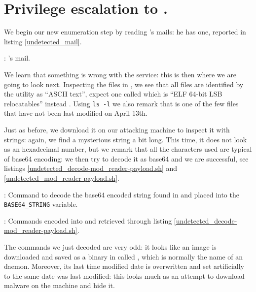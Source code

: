 \section{Privilege escalation to .}
\par We begin our new enumeration step by reading 's mails: he has one, reported in listing \ref{undetected_mail}.
\begin{listing}
  \small
  
  \caption{: 's mail.}
  \label{undetected_mail}
\end{listing}
\par We learn that something is wrong with the  service: this is then where we are going to look next. Inspecting the files in , we see that all files are identified by the  utility as ``ASCII text'', expect one called  which is ``ELF 64-bit LSB relocatables'' instead . Using \texttt{ls -l} we also remark that  is one of the few files that have not been last modified on April 13th.
\par Just as before, we download it on our attacking machine to inspect it with strings: again, we find a mysterious string a bit long. This time, it does not look as an hexadecimal number, but we remark that all the characters used are typical of base64 encoding: we then try to decode it as base64 and we are successful, see listings \ref{undetected_decode-mod_reader-payload.sh} and \ref{undetected_mod_reader-payload.sh}.
\begin{listing}
  \caption{: Command to decode the base64 encoded string found in  and placed into the \texttt{BASE64_STRING} variable.}
  \label{undetected_decode-mod_reader-payload.sh}
\end{listing}
\begin{listing}
  \tiny
  \caption{: Commands encoded into  and retrieved through listing \ref{undetected_decode-mod_reader-payload.sh}.}
  \label{undetected_mod_reader-payload.sh}
\end{listing}
\par The commands we just decoded are very odd: it looks like an image is downloaded and saved as a binary in  called , which is normally the name of an  daemon. Moreover, its last time modified date is overwritten and set artificially to the same date  was last modified: this looks much as an attempt to download malware on the machine and hide it.
